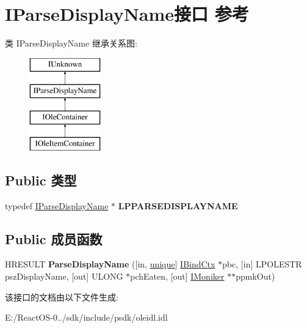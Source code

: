 \hypertarget{interface_i_parse_display_name}{}\section{I\+Parse\+Display\+Name接口 参考}
\label{interface_i_parse_display_name}
类 I\+Parse\+Display\+Name 继承关系图\+:\begin{figure}[H]
\begin{center}
\leavevmode
\includegraphics[height=4.000000cm]{interface_i_parse_display_name}
\end{center}
\end{figure}
\subsection*{Public 类型}
\begin{DoxyCompactItemize}
\item 
\mbox{\label{interface_i_parse_display_name_a6a55cf4c338a076457de05b6ba14ab0b}} 
typedef \hyperlink{interface_i_parse_display_name}{I\+Parse\+Display\+Name} $\ast$ {\bfseries L\+P\+P\+A\+R\+S\+E\+D\+I\+S\+P\+L\+A\+Y\+N\+A\+ME}
\end{DoxyCompactItemize}
\subsection*{Public 成员函数}
\begin{DoxyCompactItemize}
\item 
\mbox{\label{interface_i_parse_display_name_a56864287f8a3aeb1c078d956aec0f3f6}} 
H\+R\+E\+S\+U\+LT {\bfseries Parse\+Display\+Name} (\mbox{[}in, \hyperlink{interfaceunique}{unique}\mbox{]} \hyperlink{interface_i_bind_ctx}{I\+Bind\+Ctx} $\ast$pbc, \mbox{[}in\mbox{]} L\+P\+O\+L\+E\+S\+TR psz\+Display\+Name, \mbox{[}out\mbox{]} U\+L\+O\+NG $\ast$pch\+Eaten, \mbox{[}out\mbox{]} \hyperlink{interface_i_moniker}{I\+Moniker} $\ast$$\ast$ppmk\+Out)
\end{DoxyCompactItemize}


该接口的文档由以下文件生成\+:\begin{DoxyCompactItemize}
\item 
E\+:/\+React\+O\+S-\/0../sdk/include/psdk/oleidl.\+idl\end{DoxyCompactItemize}
